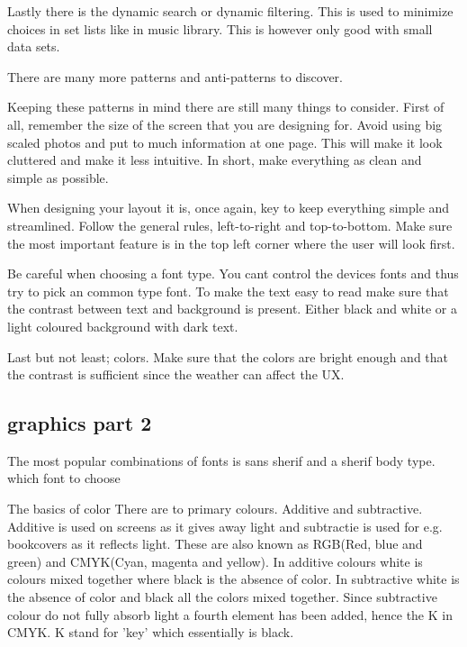 Lastly there is the dynamic search or dynamic filtering. This is used to minimize choices in set lists like in music library. This is however only good with small data sets.\cite{Pattern}

There are many more patterns and anti-patterns to discover. \cite{Pattern}

Keeping these patterns in mind there are still many things to consider. 
First of all, remember the size of the screen that you are designing for. Avoid using big scaled photos and put to much information at one page. This will make it look cluttered and make it less intuitive. \cite{Graphic}
In short, make everything as clean and simple as possible. 

When designing your layout it is, once again, key to keep everything simple and streamlined. 
Follow the general rules, left-to-right and top-to-bottom. Make sure the most important feature is in the top left corner where the user will look first.\cite{Graphic}

Be careful when choosing a font type. You cant control the devices fonts and thus try to pick an common type font.  \cite{Graphic} To make the text easy to read make sure that the contrast between text and background is present. Either black and white or a light coloured background with dark text. \cite{Graphic}

Last but not least; colors. Make sure that the colors are bright enough and that the contrast is sufficient since the weather can affect the UX. \cite{Graphic}

\subsection{graphics part 2}

The most popular combinations of fonts is sans sherif and a sherif body type. \cite{TypeComb}
which font to choose \cite{Font}

The basics of color \cite{Colour}
There are to primary colours. Additive and subtractive. Additive is used on screens as it gives away light and subtractie is used for e.g. bookcovers as it reflects light. \cite{Colour}
These are also known as RGB(Red, blue and green) and CMYK(Cyan, magenta and yellow).
In additive colours white is colours mixed together where black is the absence of color. In subtractive white is the absence of color and black all the colors mixed together. 
Since subtractive colour do not fully absorb light a fourth element has been added, hence the K in CMYK. K stand for 'key' which essentially is black.\cite{Colour}

